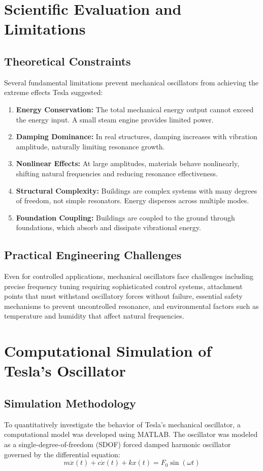 \documentclass[12pt,a4paper]{article}
\begin{document}
\section*{Scientific Evaluation and Limitations}

\subsection*{Theoretical Constraints}
Several fundamental limitations prevent mechanical oscillators from achieving the extreme effects Tesla suggested:

\begin{enumerate}
\item \textbf{Energy Conservation:} The total mechanical energy output cannot exceed the energy input. A small steam engine provides limited power.
\item \textbf{Damping Dominance:} In real structures, damping increases with vibration amplitude, naturally limiting resonance growth.
\item \textbf{Nonlinear Effects:} At large amplitudes, materials behave nonlinearly, shifting natural frequencies and reducing resonance effectiveness.
\item \textbf{Structural Complexity:} Buildings are complex systems with many degrees of freedom, not simple resonators. Energy disperses across multiple modes.
\item \textbf{Foundation Coupling:} Buildings are coupled to the ground through foundations, which absorb and dissipate vibrational energy.
\end{enumerate}

\subsection*{Practical Engineering Challenges}
Even for controlled applications, mechanical oscillators face challenges including precise frequency tuning requiring sophisticated control systems, attachment points that must withstand oscillatory forces without failure, essential safety mechanisms to prevent uncontrolled resonance, and environmental factors such as temperature and humidity that affect natural frequencies.

\section*{Computational Simulation of Tesla's Oscillator}

\subsection*{Simulation Methodology}
To quantitatively investigate the behavior of Tesla's mechanical oscillator, a computational model was developed using MATLAB. The oscillator was modeled as a single-degree-of-freedom (SDOF) forced damped harmonic oscillator governed by the differential equation:
\begin{equation}
m\ddot{x}(t) + c\dot{x}(t) + kx(t) = F_0 \sin(\omega t)
\end{equation}
\end{document}
